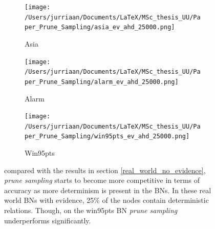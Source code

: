 \documentclass[a4paper, twoside, 11pt]{report}
\theoremstyle{plain}
\theoremstyle{definition}
\theoremstyle{remark}
\newcommand{\ps}{\textit{prune sampling }}
\begin{document}
\begin{figure}[H]
\centering
\begin{subfigure}{0.5\textwidth}
\texttt{[image: /Users/jurriaan/Documents/LaTeX/MSc\_thesis\_UU/Paper\_Prune\_Sampling/asia\_ev\_ahd\_25000.png]}
\caption{Asia}%
\label{asia}%
\end{subfigure}\hfill%
\begin{subfigure}{0.5\textwidth}
\texttt{[image: /Users/jurriaan/Documents/LaTeX/MSc\_thesis\_UU/Paper\_Prune\_Sampling/alarm\_ev\_ahd\_25000.png]}
\caption{Alarm}%
\label{alarm}%
\end{subfigure}%
\begin{subfigure}{0.5\textwidth}
\texttt{[image: /Users/jurriaan/Documents/LaTeX/MSc\_thesis\_UU/Paper\_Prune\_Sampling/win95pts\_ev\_ahd\_25000.png]}
\caption{Win95pts}%
\label{win95pts}%
\end{subfigure}\hfill%
\vspace{0.75pc}
\caption{compared with the results in section \ref{real_world_no_evidence}, \ps starts to become more competitive in terms of accuracy as more determinism is present in the BNs. In these real world BNs with evidence, 25\% of the nodes contain deterministic relations. Though, on the win95pts BN \ps underperforms significantly.}
\label{results2}
\end{figure}

\newpage
\end{document}
